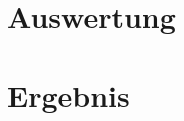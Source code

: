 \documentclass[11pt, ngerman, fleqn, DIV=15, headinclude, BCOR=2cm]{scrreprt}
\begin{document}
\fehlt%

\chapter{Auswertung}


\chapter{Ergebnis}



\begin{appendix}


\end{appendix}
\end{document}
